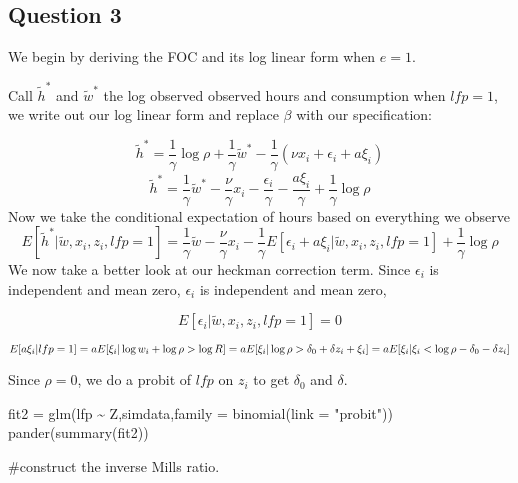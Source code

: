 \documentclass[]{article}
\newenvironment{Shaded}{\begin{snugshade}}{\end{snugshade}}
\newcommand{\AttributeTok}[1]{\textcolor[rgb]{0.77,0.63,0.00}{#1}}
\newcommand{\FunctionTok}[1]{\textcolor[rgb]{0.00,0.00,0.00}{#1}}
\newcommand{\NormalTok}[1]{#1}
\newcommand{\OtherTok}[1]{\textcolor[rgb]{0.56,0.35,0.01}{#1}}
\newcommand{\SpecialCharTok}[1]{\textcolor[rgb]{0.00,0.00,0.00}{#1}}
\newcommand{\StringTok}[1]{\textcolor[rgb]{0.31,0.60,0.02}{#1}}
\begin{document}
\hypertarget{question-3}{%
\subsection{Question 3}\label{question-3}}

We begin by deriving the FOC and its log linear form when \(e = 1\).

Call \(\tilde{h}^*\) and \(\tilde{w}^*\) the log observed observed hours
and consumption when \(lfp = 1\), we write out our log linear form and
replace \(\beta\) with our specification:

\[
 \tilde{h}^* = \frac{1}{\gamma}\log \rho + \frac{1}{\gamma}  \tilde{w}^* - \frac{1}{\gamma} (\nu x_i + \epsilon_i + a\xi_i)
\] \[
 \tilde{h}^* = \frac{1}{\gamma}  \tilde{w}^* - \frac{\nu}{\gamma}x_i - \frac{\epsilon_i}{\gamma} - \frac{a\xi_i}{\gamma} + \frac{1}{\gamma} \log \rho
\] Now we take the conditional expectation of hours based on everything
we observe \[
E[ \tilde{h}^* |\tilde{w},x_i,z_i,lfp = 1 ] = \frac{1}{\gamma} \tilde{w} - \frac{\nu}{\gamma}x_i - \frac{1}{\gamma} E[\epsilon_i + a\xi_i |\tilde{w},x_i,z_i,lfp = 1 ] + \frac{1}{\gamma} \log \rho
\] We now take a better look at our heckman correction term. Since
\(\epsilon_i\) is independent and mean zero, \(\epsilon_i\) is
independent and mean zero,

\[
E[\epsilon_i | \tilde{w},x_i,z_i,lfp = 1] = 0 
\]

\[
E[a\xi_i|lfp = 1 ] = aE[\xi_i|\log w_i + \log \rho > \log R ]\\ = aE[\xi_i| \log \rho > \delta_0 + \delta z_i + \xi_i ]\\ = aE[\xi_i| \xi_i < \log \rho - \delta_0 - \delta z_i ]\\
\]

Since \(\rho = 0\), we do a probit of \(lfp\) on \(z_i\) to get
\(\delta_0\) and \(\delta\).

\begin{Shaded}
\begin{Highlighting}[]
\NormalTok{fit2 }\OtherTok{=} \FunctionTok{glm}\NormalTok{(lfp }\SpecialCharTok{\textasciitilde{}}\NormalTok{ Z,simdata,}\AttributeTok{family =} \FunctionTok{binomial}\NormalTok{(}\AttributeTok{link =} \StringTok{"probit"}\NormalTok{))}
\FunctionTok{pander}\NormalTok{(}\FunctionTok{summary}\NormalTok{(fit2)) }
\end{Highlighting}
\end{Shaded}

\#construct the inverse Mills ratio.
\end{document}
